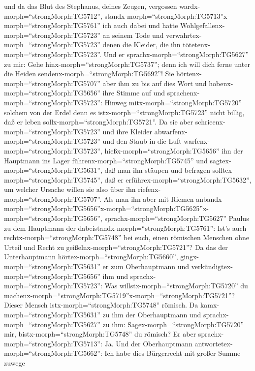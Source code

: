  und da das Blut des Stephanus, deines Zeugen, vergossen
wardx-morph=``strongMorph:TG5712'',
standx-morph=``strongMorph:TG5713''x-morph=``strongMorph:TG5761'' ich
auch dabei und hatte Wohlgefallenx-morph=``strongMorph:TG5723'' an
seinem Tode und verwahrtex-morph=``strongMorph:TG5723'' denen die
Kleider, die ihn tötetenx-morph=``strongMorph:TG5723''. 
Und er sprachx-morph=``strongMorph:TG5627'' zu mir: Gehe
hinx-morph=``strongMorph:TG5737''; denn ich will dich ferne unter die
Heiden sendenx-morph=``strongMorph:TG5692''!  Sie
hörtenx-morph=``strongMorph:TG5707'' aber ihm zu bis auf dies Wort und
hobenx-morph=``strongMorph:TG5656'' ihre Stimme auf und
sprachenx-morph=``strongMorph:TG5723'': Hinweg
mitx-morph=``strongMorph:TG5720'' solchem von der Erde! denn es
istx-morph=``strongMorph:TG5723'' nicht billig, daß er leben
sollx-morph=``strongMorph:TG5721''.  Da sie aber
schrieenx-morph=``strongMorph:TG5723'' und ihre Kleider
abwarfenx-morph=``strongMorph:TG5723'' und den Staub in die Luft
warfenx-morph=``strongMorph:TG5723'', 
hießx-morph=``strongMorph:TG5656'' ihn der Hauptmann ins Lager
führenx-morph=``strongMorph:TG5745'' und
sagtex-morph=``strongMorph:TG5631'', daß man ihn stäupen und befragen
solltex-morph=``strongMorph:TG5745'', daß er
erführex-morph=``strongMorph:TG5632'', um welcher Ursache willen sie
also über ihn riefenx-morph=``strongMorph:TG5707''.  Als
man ihn aber mit Riemen
anbandx-morph=``strongMorph:TG5656''\textbar x-morph=``strongMorph:TG5625''x-morph=``strongMorph:TG5656'',
sprachx-morph=``strongMorph:TG5627'' Paulus zu dem Hauptmann der
dabeistandx-morph=``strongMorph:TG5761'': Ist's auch
rechtx-morph=``strongMorph:TG5748'' bei euch, einen römischen Menschen
ohne Urteil und Recht zu geißelnx-morph=``strongMorph:TG5721''?
 Da das der Unterhauptmann
hörtex-morph=``strongMorph:TG5660'', gingx-morph=``strongMorph:TG5631''
er zum Oberhauptmann und verkündigtex-morph=``strongMorph:TG5656'' ihm
und sprachx-morph=``strongMorph:TG5723'': Was
willstx-morph=``strongMorph:TG5720'' du
machenx-morph=``strongMorph:TG5719''x-morph=``strongMorph:TG5721''?
Dieser Mensch istx-morph=``strongMorph:TG5748'' römisch. 
Da kamx-morph=``strongMorph:TG5631'' zu ihm der Oberhauptmann und
sprachx-morph=``strongMorph:TG5627'' zu ihm:
Sagex-morph=``strongMorph:TG5720'' mir,
bistx-morph=``strongMorph:TG5748'' du römisch? Er aber
sprachx-morph=``strongMorph:TG5713'': Ja.  Und der
Oberhauptmann antwortetex-morph=``strongMorph:TG5662'': Ich habe dies
Bürgerrecht mit großer Summe zuwege
